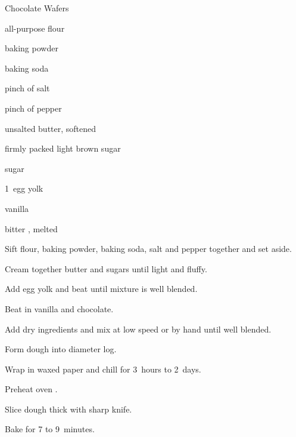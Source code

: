 \begin{recipe}{Chocolate Wafers}{}{}

\begin{ingredients}
\item {} all-purpose flour
\item \tp{\half} baking powder
\item \tp{\quarter} baking soda
\item pinch of salt
\item pinch of pepper
\item \C{\threequarter} unsalted butter, softened 
\item \C{\quarter} firmly packed light brown sugar
\item \C{\quarter} sugar
\item 1~egg yolk
\item {} vanilla
\item \C{\eighth} bitter , melted 
\end{ingredients}

\begin{directions}
\item Sift flour, baking powder, baking soda, salt and pepper together and set aside.
\item Cream together butter and sugars until light and fluffy.
\item Add egg yolk and beat until mixture is well blended.
\item Beat in vanilla and chocolate.
\item Add dry ingredients and mix at low speed or by hand until well blended.
\item Form dough into  diameter log.
\item Wrap in waxed paper and chill for 3~hours to 2~days.
\item Preheat oven .
\item Slice dough \cm{\quarter} thick with sharp knife.
\item Bake for 7 to 9~minutes.
\end{directions}

\end{recipe}
